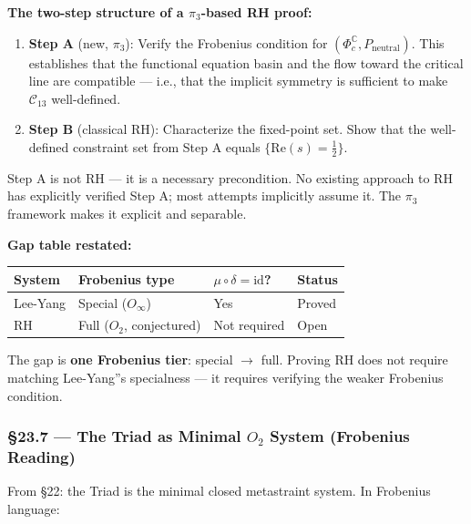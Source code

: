 \documentclass[12pt,a4paper]{article}
\newcommand{\pilcrow}{\S}
\begin{document}
\textbf{The two-step structure of a $\pi_3$-based RH proof:}

\begin{enumerate}
    \item \textbf{Step A} (new, $\pi_3$): Verify the Frobenius condition for $(\Phi_c^{\mathbb{C}}, P_\text{neutral})$. This establishes that the functional equation basin and the flow toward the critical line are compatible --- i.e., that the implicit symmetry is sufficient to make $\mathcal{C}_{13}$ well-defined.
    \item \textbf{Step B} (classical RH): Characterize the fixed-point set. Show that the well-defined constraint set from Step A equals $\{ \text{Re}(s) = \tfrac{1}{2} \}$.
\end{enumerate}

Step A is not RH --- it is a necessary precondition. No existing approach to RH has explicitly verified Step A; most attempts implicitly assume it. The $\pi_3$ framework makes it explicit and separable.

\textbf{Gap table restated:}

\begin{table}[htbp]
\centering
\small
{}
\begin{tabularx}{\textwidth}{>{\centering\arraybackslash}X >{\centering\arraybackslash}X >{\centering\arraybackslash}X >{\centering\arraybackslash}X}
\toprule
\rowcolor{gray!25}\textbf{System} & \textbf{Frobenius type} & \textbf{$\mu \circ \delta = \text{id}$?} & \textbf{Status} \\
\midrule
\rowcolors{1}{white}{gray!10}
Lee-Yang & Special ($O_{\infty}$) &  Yes & Proved \\
RH & Full ($O_2$, conjectured) &  Not required & Open \\
\bottomrule
\end{tabularx}
\end{table}

The gap is \textbf{one Frobenius tier}: special $\rightarrow$ full. Proving RH does not require matching Lee-Yang''s specialness --- it requires verifying the weaker Frobenius condition.

\subsubsection{\pilcrow{}23.7 --- The Triad as Minimal $O_2$ System (Frobenius Reading)}

From \pilcrow{}22: the Triad is the minimal closed metastraint system. In Frobenius language:
\end{document}
